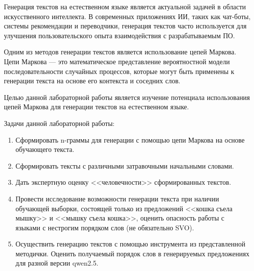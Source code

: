 
Генерация текстов на естественном языке является актуальной задачей в области искусственного интеллекта. В современных приложениях ИИ, таких как чат-боты, 
системы рекомендации и переводчики, генерация текстов часто используется для улучшения пользовательского опыта взаимодействия с разрабатываемым ПО.

Одним из методов генерации текстов является использование цепей Маркова. Цепи Маркова — это математическое представление вероятностной  модели последовательности случайных процессов, которые могут быть применены к генерации текста на основе его контекста и соседних слов.

Целью данной лабораторной работы является изучение потенциала использования цепей Маркова для генерации текстов на естественном языке. 

Задачи данной лабораторной работы:
\begin{enumerate}[label*=\arabic*.]
	\item Сформировать n-граммы для генерации с помощью цепи Маркова на основе обучающего текста.
	\item Сформировать тексты с различными затравочными начальными словами.
	\item Дать экспертную оценку <<человечности>> сформированных текстов.
	\item Провести исследование возможности генерации текста при наличии обучающей выборки, состоящей только из предложений <<кошка съела мышку>> и <<мышку съела кошка>>, оценить опасность работы с языками с нестрогим порядком слов (не обязательно SVO).
	\item Осуществить генерацию текстов с помощью инструмента из представленной методички. Оценить получаемый порядок слов в генерируемых предложениях для разной версии qwen2.5.
\end{enumerate}

\clearpage
